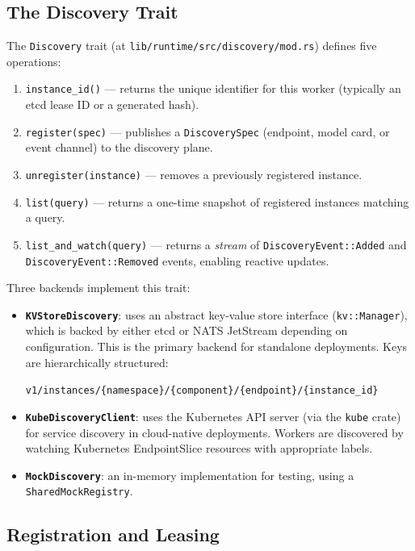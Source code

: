 \subsection{The Discovery Trait}

The \texttt{Discovery} trait (at \texttt{lib/runtime/src/discovery/mod.rs}) defines five operations:

\begin{enumerate}
  \item \texttt{instance\_id()} --- returns the unique identifier for this worker (typically an etcd lease ID or a generated hash).
  \item \texttt{register(spec)} --- publishes a \texttt{DiscoverySpec} (endpoint, model card, or event channel) to the discovery plane.
  \item \texttt{unregister(instance)} --- removes a previously registered instance.
  \item \texttt{list(query)} --- returns a one-time snapshot of registered instances matching a query.
  \item \texttt{list\_and\_watch(query)} --- returns a \emph{stream} of \texttt{Discovery\-Event::Added} and \texttt{Discovery\-Event::Removed} events, enabling reactive updates.
\end{enumerate}

Three backends implement this trait:

\begin{itemize}
  \item \textbf{\texttt{KVStoreDiscovery}}: uses an abstract key-value store interface (\texttt{kv::Manager}), which is backed by either etcd or NATS JetStream depending on configuration. This is the primary backend for standalone deployments. Keys are hierarchically structured:


\texttt{v1/instances/\{namespace\}/\{component\}/\{endpoint\}/\{instance\_id\}}


  \item \textbf{\texttt{KubeDiscoveryClient}}: uses the Kubernetes API server (via the \texttt{kube} crate) for service discovery in cloud-native deployments. Workers are discovered by watching Kubernetes EndpointSlice resources with appropriate labels.

  \item \textbf{\texttt{MockDiscovery}}: an in-memory implementation for testing, using a \texttt{SharedMockRegistry}.
\end{itemize}

\subsection{Registration and Leasing}

